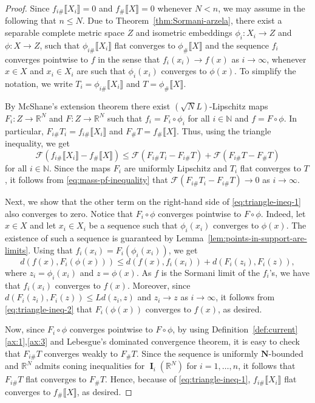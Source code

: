 \documentclass[reqno]{amsart}
\numberwithin{equation}{section}
\newcommand{\R}{\mathbb{R}}
\newcommand{\N}{\mathbb{N}}
\newcommand{\bb}[1]{\llbracket #1\rrbracket}
\DeclareMathOperator{\bI}{\mathbf{I}}
\begin{document}
\begin{proof}
Since \(f_{i\#} \bb{X_{i}}=0\) and \(f_\# \bb{X}=0\) whenever \(N < n\), we may assume in the following that \(n\leq N\). Due to Theorem~\ref{thm:Sormani-arzela}, there exist a separable complete metric space \(Z\) and isometric embeddings \(\phi_i \colon X_i \to Z\) and \(\phi \colon X \to Z\), such that \(\phi_{i\#} \bb{X_i}\) flat converges to \(\phi_\# \bb{X}\) and the sequence \(f_i\) converges pointwise to \(f\) in the sense that \(f_i(x_i)\to f(x)\) as \(i\to \infty\), whenever \(x\in X\) and \(x_i\in X_i\) are such that \(\phi_i(x_i)\) converges to \(\phi(x)\).  To simplify the notation, we write \(T_i=\phi_{i\#}\bb{X_i}\) and \(T=\phi_{\#}\bb{X}\). 

 By McShane's extension theorem \cite[Theorem 1.27]{brudnyi2012} there exist $(\sqrt{N}L)$-Lipschitz maps 
 \(F_i\colon Z\to \R^N\) and \(F\colon Z\to \R^N\) such that \(f_i=F_i \circ \phi_i\) for all \(i\in \N\) and \(f=F\circ \phi\). In particular, \(F_{i\#} T_i=f_{i\#} \bb{X_i}\) and \(F_\# T=f_\# \bb{X}\). Thus, using the triangle inequality, we get
\begin{equation}\label{eq:triangle-ineq-1}
\mathcal{F}(f_{i\#} \bb{X_i}-f_\# \bb{X}) \leq \mathcal{F}(F_{i\#} T_i-F_{i\#}T)+\mathcal{F}(F_{i\#}T-F_\# T)
\end{equation}
for all \(i\in \N\). Since the maps \(F_i\) are uniformly Lipschitz and \(T_i\) flat converges to \(T\), it follows from \eqref{eq:mass-pf-inequality} that \(\mathcal{F}(F_{i\#} T_i-F_{i\#}T)\to 0\) as \(i\to \infty\).

Next, we show that the other term on the right-hand side of \eqref{eq:triangle-ineq-1} also converges to zero. Notice that \(F_i\circ \phi\) converges pointwise to \(F\circ \phi\). Indeed, let \(x\in X\) and let \(x_i\in X_i\) be a sequence such that \(\phi_i(x_i)\) converges to \(\phi(x)\). The existence of such a sequence is guaranteed by Lemma~\ref{lem:points-in-support-are-limits}.  Using that \(f_i(x_i)=F_i(\phi_i(x_i))\), we get
\begin{equation}\label{eq:triangle-ineq-2}
d(f(x), F_i(\phi(x)))\leq d(f(x), f_i(x_i))+d(F_i(z_i), F_i(z)),
\end{equation}
where \(z_i=\phi_i(x_i)\) and \(z=\phi(x)\).
As \(f\) is the Sormani limit of the \(f_i\)'s, we have that \(f_i(x_i)\) converges to \(f(x)\). Moreover, since \(d(F_i(z_i), F_i(z))\leq L d(z_i, z)\) and \(z_i \to z\) as \(i\to \infty\), it follows from \eqref{eq:triangle-ineq-2} that \(F_i(\phi(x))\) converges to \(f(x)\), as desired. 

Now, since \(F_i\circ \phi\) converges pointwise to \(F\circ \phi\), by using  Definition~\ref{def:current}\eqref{ax:1},\eqref{ax:3} and Lebesgue's dominated convergence theorem, it is easy to check that \(F_{i\#} T\) converges weakly to \(F_\# T\). Since the sequence is uniformly \(\mathbf{N}\)-bounded and $\mathbb{R}^N$ admits coning inequalities for \(\bI_i(\R^N)\) for \(i=1, \dots, n\), it follows that \(F_{i\#}T\) flat converges to \(F_\# T\). Hence, because of \eqref{eq:triangle-ineq-1}, \(f_{i\#} \bb{X_i}\) flat converges to \(f_\# \bb{X}\), as desired.
\end{proof}
\end{document}
